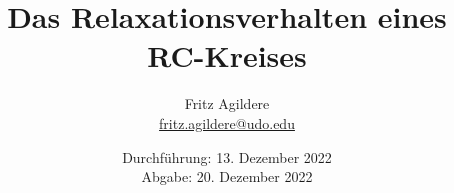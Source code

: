 

\subject{\texorpdfstring{\vspace{2ex}}{}353\texorpdfstring{\vspace{-2ex}}{}} %
\title{Das Relaxationsverhalten eines RC\texorpdfstring{\hspace{0.15ex}}{}-Kreises} %
\date{
	Durchführung: 13. Dezember 2022 %
	\\ Abgabe: 20. Dezember 2022 %
}
\author{
	Fritz Agildere\\ %
	\href{mailto:fritz.agildere@udo.edu}{fritz.agildere@udo.edu} %
}

\renewcommand\multicitedelim{\addcomma\hspace{0.15ex}}



\maketitle
{}

\thispagestyle{empty}
\tableofcontents
\newpage






\printbibliography{}


